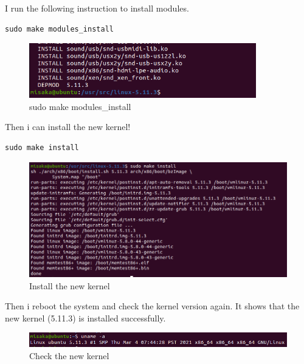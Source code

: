 \documentclass[UTF8,10pt,a4paper]{article}
\theoremstyle{Problem}
\newtheorem{prob}{题}
\theoremstyle{Solution}
\newtheorem*{sol}{解}
\begin{document}
I run the following instruction to install modules.

\begin{lstlisting}
sudo make modules_install
\end{lstlisting}

\begin{figure}[H]
    \centering
    \includegraphics[width=280pt]{10.png}
    \caption{sudo make modules\_install}
    \label{10}
\end{figure}

Then i can install the new kernel!

\begin{lstlisting}
sudo make install
\end{lstlisting}

\begin{figure}[H]
    \centering
    \includegraphics[width=400pt]{11.png}
    \caption{Install the new kernel}
    \label{11}
\end{figure}

Then i reboot the system and check the kernel version again. It shows that the new kernel (5.11.3) is installed successfully.

\begin{figure}[H]
    \centering
    \includegraphics[width=420pt]{12.png}
    \caption{Check the new kernel}
    \label{12}
\end{figure}

\end{document}
